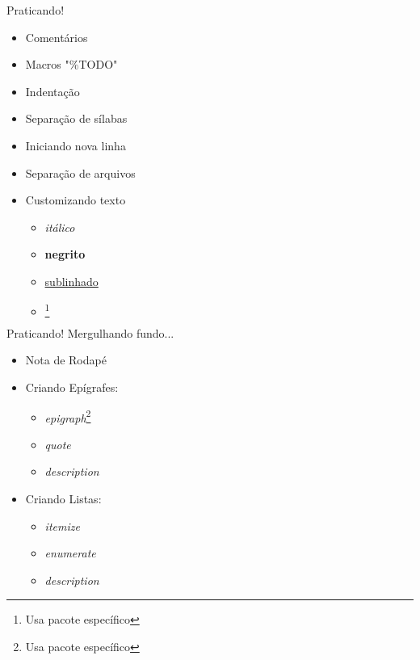 \begin{frame}{Praticando!}
    \begin{itemize}
        \item Comentários
        \item Macros "$\%$TODO"
        \item Indentação
        \item Separação de sílabas
        \item Iniciando nova linha
        \item Separação de arquivos
        \item Customizando texto
        \begin{itemize}
            \item \textit{itálico}
            \item \textbf{negrito}
            \item \underline{sublinhado}
            \item {}\footnote{Usa pacote específico}
        \end{itemize}
     \end{itemize}
\end{frame}

\begin{frame}{Praticando! Mergulhando fundo...}
    \begin{itemize}
        \item Nota de Rodapé
        \item Criando Epígrafes:
            \begin{itemize}
                \item \textit{epigraph}\footnote{Usa pacote específico}
                \item \textit{quote}
                \item \textit{description}
            \end{itemize}
        \item Criando Listas:
            \begin{itemize}
                \item \textit{itemize}
                \item \textit{enumerate}
                \item \textit{description}
            \end{itemize}
                
    \end{itemize}
\end{frame}

